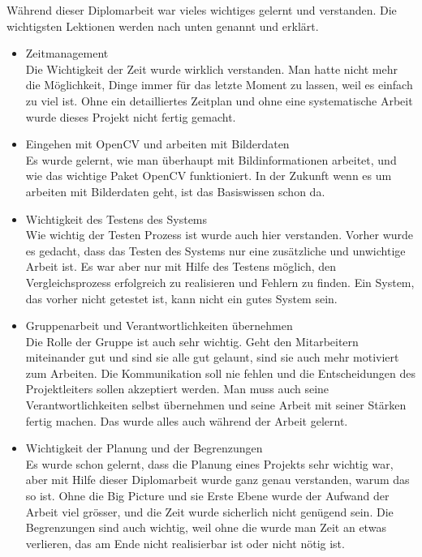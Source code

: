 Während dieser Diplomarbeit war vieles wichtiges gelernt und verstanden. Die wichtigsten Lektionen werden nach unten genannt und erklärt.\\
\begin{itemize}
	\item Zeitmanagement \\
	
	Die Wichtigkeit der Zeit wurde wirklich verstanden. Man hatte nicht mehr die Möglichkeit, Dinge immer für das letzte Moment zu lassen, weil es einfach zu viel ist. Ohne ein detailliertes Zeitplan und ohne eine systematische Arbeit wurde dieses Projekt nicht fertig gemacht.
	
	\item Eingehen mit OpenCV und arbeiten mit Bilderdaten\\
	
	Es wurde gelernt, wie man überhaupt mit Bildinformationen arbeitet, und wie das wichtige Paket OpenCV funktioniert. In der Zukunft wenn es um arbeiten mit Bilderdaten geht, ist das Basiswissen schon da.
	
	\item Wichtigkeit des Testens des Systems\\
	
	Wie wichtig der Testen Prozess ist wurde auch hier verstanden. Vorher wurde es gedacht, dass das Testen des Systems nur eine zusätzliche und unwichtige Arbeit ist. Es war aber nur mit Hilfe des Testens möglich, den Vergleichsprozess erfolgreich zu realisieren und Fehlern zu finden. Ein System, das vorher nicht getestet ist, kann nicht ein gutes System sein.
	
	\item Gruppenarbeit und Verantwortlichkeiten übernehmen \\
	
	Die Rolle der Gruppe ist auch sehr wichtig. Geht den Mitarbeitern miteinander gut und sind sie alle gut gelaunt, sind sie auch mehr motiviert zum Arbeiten. Die Kommunikation soll nie fehlen und die Entscheidungen des Projektleiters sollen akzeptiert werden. Man muss auch seine Verantwortlichkeiten selbst übernehmen und seine Arbeit mit seiner Stärken fertig machen. Das wurde alles auch während der Arbeit gelernt.
	
	\item Wichtigkeit der Planung und der Begrenzungen \\
	
	Es wurde schon gelernt, dass die Planung eines Projekts sehr wichtig war, aber mit Hilfe dieser Diplomarbeit wurde ganz genau verstanden, warum das so ist. Ohne die Big Picture und sie Erste Ebene wurde der Aufwand der Arbeit viel grösser, und die Zeit wurde sicherlich nicht genügend sein. Die Begrenzungen sind auch wichtig, weil ohne die wurde man Zeit an etwas verlieren, das am Ende nicht realisierbar ist oder nicht nötig ist.
	

\end{itemize}
